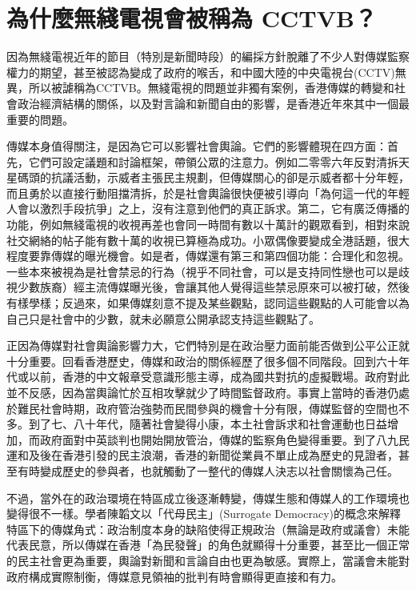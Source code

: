 \section{為什麼無綫電視會被稱為 CCTVB？}

因為無綫電視近年的節目（特別是新聞時段）的編採方針脫離了不少人對傳媒監察權力的期望，甚至被認為變成了政府的喉舌，和中國大陸的中央電視台(CCTV)無異，所以被謔稱為CCTVB。無綫電視的問題並非獨有案例，香港傳媒的轉變和社會政治經濟結構的關係，以及對言論和新聞自由的影響，是香港近年來其中一個最重要的問題。

傳媒本身值得關注，是因為它可以影響社會輿論。它們的影響體現在四方面：首先，它們可設定議題和討論框架，帶領公眾的注意力。例如二零零六年反對清拆天星碼頭的抗議活動，示威者主張民主規劃，但傳媒關心的卻是示威者都十分年輕，而且勇於以直接行動阻擋清拆，於是社會輿論很快便被引導向「為何這一代的年輕人會以激烈手段抗爭」之上，沒有注意到他們的真正訴求。第二，它有廣泛傳播的功能，例如無綫電視的收視再差也會同一時間有數以十萬計的觀眾看到，相對來說社交網絡的帖子能有數十萬的收視已算極為成功。小眾偶像要變成全港話題，很大程度要靠傳媒的曝光機會。如是者，傳媒還有第三和第四個功能：合理化和忽視。一些本來被視為是社會禁忌的行為（視乎不同社會，可以是支持同性戀也可以是歧視少數族裔）經主流傳媒曝光後，會讓其他人覺得這些禁忌原來可以被打破，然後有樣學樣；反過來，如果傳媒刻意不提及某些觀點，認同這些觀點的人可能會以為自己只是社會中的少數，就未必願意公開承認支持這些觀點了。

正因為傳媒對社會輿論影響力大，它們特別是在政治壓力面前能否做到公平公正就十分重要。回看香港歷史，傳媒和政治的關係經歷了很多個不同階段。回到六十年代或以前，香港的中文報章受意識形態主導，成為國共對抗的虛擬戰場。政府對此並不反感，因為當輿論忙於互相攻擊就少了時間監督政府。事實上當時的香港仍處於難民社會時期，政府管治強勢而民間參與的機會十分有限，傳媒監督的空間也不多。到了七、八十年代，隨著社會變得小康，本土社會訴求和社會運動也日益增加，而政府面對中英談判也開始開放管治，傳媒的監察角色變得重要。到了八九民運和及後在香港引發的民主浪潮，香港的新聞從業員不單止成為歷史的見證者，甚至有時變成歷史的參與者，也就觸動了一整代的傳媒人決志以社會關懷為己任。

不過，當外在的政治環境在特區成立後逐漸轉變，傳媒生態和傳媒人的工作環境也變得很不一樣。學者陳韜文以「代母民主」(Surrogate Democracy)的概念來解釋特區下的傳媒角式：政治制度本身的缺陷使得正規政治（無論是政府或議會）未能代表民意，所以傳媒在香港「為民發聲」的角色就顯得十分重要，甚至比一個正常的民主社會更為重要，輿論對新聞和言論自由也更為敏感。實際上，當議會未能對政府構成實際制衡，傳媒意見領袖的批判有時會顯得更直接和有力。

